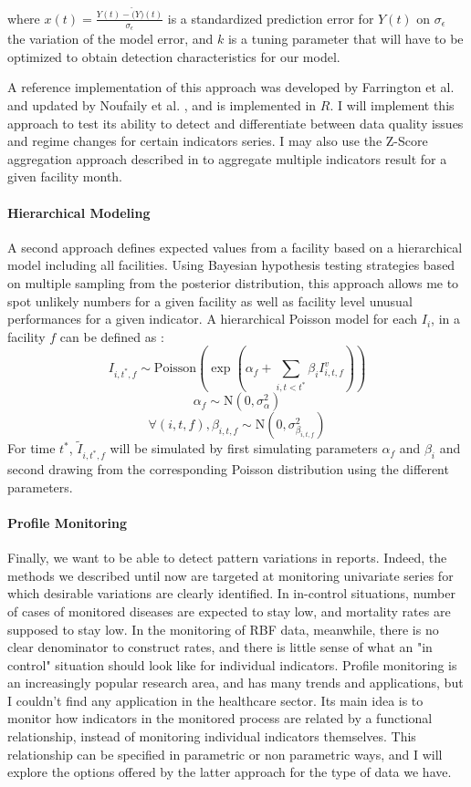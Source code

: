where $x(t) = \frac{Y(t) - \hat(Y)(t)}{\sigma_\epsilon}$ is a standardized prediction error for $Y(t)$ on $\sigma_\epsilon$ the variation of the model error, and $k$ is a tuning parameter that will have to be optimized to obtain detection characteristics for our model.

A reference implementation of this approach was developed by Farrington et al. \citep{farrington_statistical_1996} and updated by Noufaily et al. \citep{noufaily_improved_2013}, and is implemented in $R$. I will implement this approach to test its ability to detect and differentiate between data quality issues and regime changes for certain indicators series. I may also use the Z-Score aggregation approach described in \citep{bardsley_using_2009} to aggregate multiple indicators result for a given facility month.

\paragraph{Hierarchical Modeling} A second approach defines expected values from a facility based on a hierarchical model including all facilities. Using Bayesian hypothesis testing strategies based on multiple sampling from the posterior distribution, this approach allows me to spot unlikely numbers for a given facility as well as facility level unusual performances for a given indicator\citep{ohlssen_hierarchical_2007}. A hierarchical Poisson model for each $I_i$, in a facility $f$ can be defined as :
$$ I_{i,t^{*},f} \sim \mathrm{Poisson}(\exp{(\alpha_f + \sum_{i, t < t^{*}}{\beta_{i} I^v_{i,t,f}})})$$
$$\alpha_f \sim \mathrm{N}(0 , \sigma^2_\alpha)$$
$$ \forall (i , t , f) , \beta_{i,t,f} \sim \mathrm{N}(0 , \sigma^2_{\beta_{i,t,f}}) $$
For time $t^{*}$, $\tilde{I}_{i,t^{*},f}$ will be simulated by first simulating parameters $\alpha_f$ and $\beta_i$ and second drawing from the corresponding Poisson distribution using the different parameters.

\paragraph{Profile Monitoring} Finally, we want to be able to detect pattern variations in reports. Indeed, the methods we described until now are targeted at monitoring univariate series for which desirable variations are clearly identified. In in-control situations, number of cases of monitored diseases are expected to stay low, and mortality rates are supposed to stay low. In the monitoring of RBF data, meanwhile, there is no clear denominator to construct rates, and there is little sense of what an "in control" situation should look like for individual indicators. Profile  monitoring is an increasingly popular research area\citep{woodall_current_2014}, and has many trends and applications, but I couldn't find any application in the healthcare sector. Its main idea is to monitor how indicators in the monitored process are related by a functional relationship, instead of monitoring individual indicators themselves. This relationship can be specified in parametric\citep{mahmoud_simple_2011} or non parametric ways\citep{chicken_nonparametric_2011}, and I will explore the options offered by the latter approach for the type of data we have.

